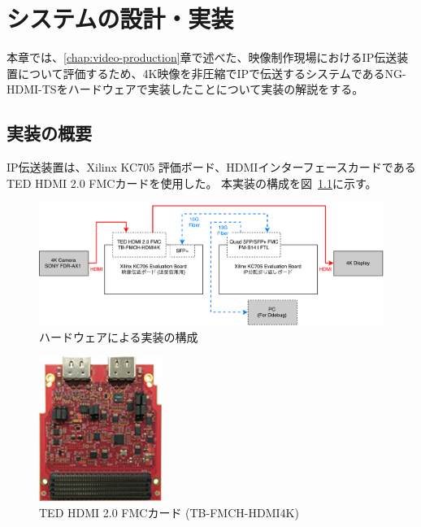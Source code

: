 \chapter{システムの設計・実装}
\label{chap:implementation}

本章では、\ref{chap:video-production}章で述べた、映像制作現場におけるIP伝送装置について評価するため、4K映像を非圧縮でIPで伝送するシステムであるNG-HDMI-TSをハードウェアで実装したことについて実装の解説をする。

\section{実装の概要}

IP伝送装置は、Xilinx KC705 評価ボード\cite{xilinx-kc705}、HDMIインターフェースカードであるTED HDMI 2.0 FMCカード\cite{ted-hdmi4k}を使用した。
本実装の構成を図~\ref{fig:fpga-implement-flow}に示す。

\begin{figure}[htbp]
  \begin{center}
    \includegraphics[bb=0 0 841 299,width=15.5cm]{img/fpga-implement-flow.pdf}
  \end{center}
  \caption{ハードウェアによる実装の構成}
  \label{fig:fpga-implement-flow}
\end{figure}

\begin{figure}[htbp]
  \begin{center}
    \includegraphics[bb=0 0 137 161,width=4cm]{img/ted-4k-fmc-card.jpg}
  \end{center}
  \caption{TED HDMI 2.0 FMCカード (TB-FMCH-HDMI4K)}
  \label{fig:ted-4k-fmc-card}
\end{figure}

